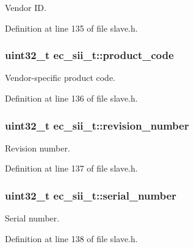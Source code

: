 Vendor I\-D. 



Definition at line 135 of file slave.\-h.

\subsubsection[{product\-\_\-code}]{\setlength{\rightskip}{0pt plus 5cm}uint32\-\_\-t ec\-\_\-sii\-\_\-t\-::product\-\_\-code}\label{structec__sii__t_a69a301c8203300eddd299807a617ad03}


Vendor-\/specific product code. 



Definition at line 136 of file slave.\-h.

\subsubsection[{revision\-\_\-number}]{\setlength{\rightskip}{0pt plus 5cm}uint32\-\_\-t ec\-\_\-sii\-\_\-t\-::revision\-\_\-number}\label{structec__sii__t_aa79fdd16cea2f20a85510260d76005b2}


Revision number. 



Definition at line 137 of file slave.\-h.

\subsubsection[{serial\-\_\-number}]{\setlength{\rightskip}{0pt plus 5cm}uint32\-\_\-t ec\-\_\-sii\-\_\-t\-::serial\-\_\-number}\label{structec__sii__t_a439dea178e64634c3821493384d8d9e1}


Serial number. 



Definition at line 138 of file slave.\-h.

